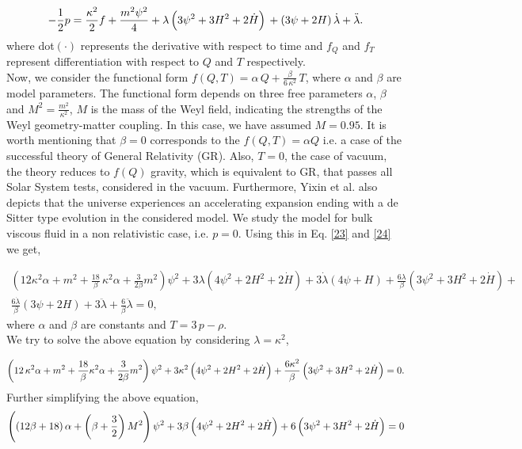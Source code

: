 \begin{equation}
\label{24}
-\frac{1}{2}p=\frac{\kappa^2}{2}f+\frac{m^2\psi^2}{4}+\lambda\left(3\psi^2+3H^2+2\dot{H}\right)\\
+\left(3\psi+2H\right)\dot{\lambda}+\ddot{\lambda}.
\end{equation}
where dot$(\cdot)$ represents the derivative with respect to time and $f_Q$ and $f_T$ represent differentiation with respect to $Q$ and $T$ respectively.\\

Now, we consider the functional form $f(Q,T)=\alpha \,Q+\frac{\beta}{6\,\kappa^2}\,T$, where $\alpha$ and $\beta$ are model parameters. The functional form depends on three free parameters $\alpha$, $\beta$ and $M^2=\frac{m^2}{\kappa^2}$, $M$ is the mass of the Weyl field, indicating the strengths of the Weyl geometry-matter coupling. In this case, we have assumed $M=0.95$. It is worth mentioning that $\beta=0$ corresponds to the $f(Q, T)= \alpha Q$ i.e. a case of the successful theory of General Relativity (GR). Also,  $T=0$, the case of vacuum, the theory reduces to $f(Q)$ gravity, which is equivalent to GR, that passes all Solar System tests, considered in the vacuum.  Furthermore, Yixin et al. \cite{Xu/2019,2020} also depicts that the universe experiences an accelerating expansion ending with a de Sitter type evolution in the considered model. We study the model for bulk viscous fluid in a non relativistic case, i.e. $p=0$. 
Using this in Eq. \eqref{23} and \eqref{24} we get,

\begin{multline}
\label{25}
\left(12\kappa^2 \alpha+m^2+\frac{18}{\beta}\,\kappa^2\alpha+\frac{3}{2\beta}m^2 \right)\psi^2+3\lambda\left(4\psi^2+2H^2+2\dot{H}\right)
+3\dot{\lambda}\left(4\psi+H\right)+\frac{6\lambda}{\beta}\left(3\psi^2+3H^2+2\dot{H}\right)+\\\frac{6\dot{\lambda}}{\beta}\left(3\psi+2H\right)+3\ddot{\lambda}
+\frac{6}{\beta}\ddot{\lambda}=0,
\end{multline}
where $\alpha$ and $\beta$ are constants and $T=3\,p-\rho$.\\
We try to solve the above equation by considering $\lambda=\kappa^2$,

\begin{equation}
\label{26}
\left(12\,\kappa^2 \alpha+m^2+\frac{18}{\beta}\kappa^2\alpha+\frac{3}{2\beta}m^2 \right)\psi^2+\\
3\kappa^2\left(4\psi^2+2H^2+2\dot{H}\right)
+\frac{6\kappa^2}{\beta}\left(3\psi^2+3H^2+2\dot{H}\right)=0.
\end{equation}
Further simplifying the above equation,
\begin{equation}
 \left(\left(12\beta+18\right)\alpha+\left(\beta+\frac{3}{2}\right)M^2\right)\psi^2+\\
 3\beta \left(4\psi^2+2H^2+2\dot{H}\right)
 +6\left(3\psi^2+3H^2+2\dot{H}\right)=0
 \label{27}
\end{equation}

